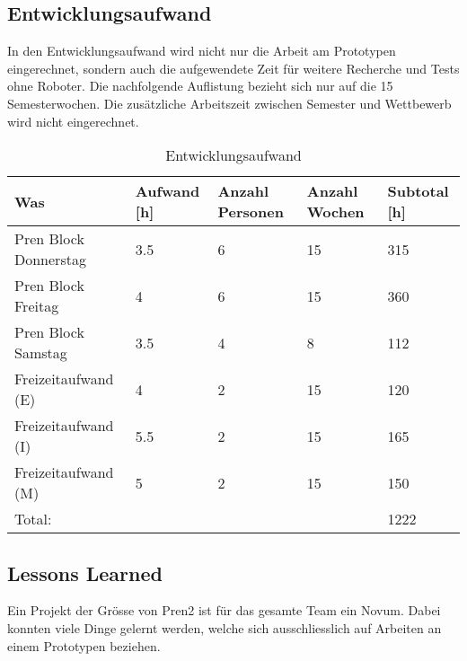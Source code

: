 \newpage

\subsection{Entwicklungsaufwand}

In den Entwicklungsaufwand wird nicht nur die Arbeit am Prototypen eingerechnet, sondern auch die aufgewendete Zeit für weitere Recherche und Tests ohne Roboter.
Die nachfolgende Auflistung bezieht sich nur auf die 15 Semesterwochen. Die zusätzliche Arbeitszeit zwischen Semester und Wettbewerb wird nicht eingerechnet.

\begin{center}
\begin{table}[H]
\begin{tabularx}{\textwidth}{|X|X|X|X|X|}
\hline
\textbf {Was} & \textbf{Aufwand [h]} &
\textbf{Anzahl Personen} & \textbf{Anzahl Wochen} & \textbf{Subtotal [h]}\\
\hline
Pren Block Donnerstag & 3.5 & 6 & 15 & 315 \\
\hline
Pren Block Freitag & 4 & 6 & 15 & 360 \\
\hline
Pren Block Samstag & 3.5 & 4 & 8 & 112 \\
\hline
Freizeitaufwand (E) & 4 & 2 & 15 & 120 \\
\hline
Freizeitaufwand (I) & 5.5  & 2 & 15 & 165 \\
\hline
Freizeitaufwand (M) & 5 & 2 & 15 & 150 \\
\hline
Total: & & & & 1222 \\ \hline
\end{tabularx}
\caption[Entwicklungsaufwand]{Entwicklungsaufwand}
\label{tab:entwicklungsaufwand}
\end{table}
\end{center}

\newpage

\subsection{Lessons Learned}


Ein Projekt der Grösse von Pren2 ist für das gesamte Team ein Novum. Dabei konnten viele Dinge gelernt werden, welche sich ausschliesslich auf Arbeiten an einem Prototypen beziehen.

